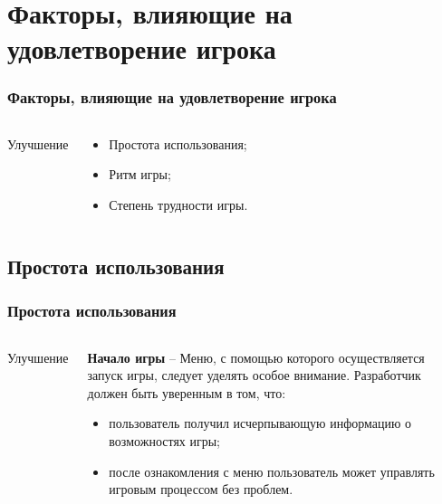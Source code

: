 \documentclass[10pt]{beamer}
\begin{document}
\section{Факторы, влияющие на удовлетворение игрока}
\begin{frame}
\frametitle{Факторы, влияющие на удовлетворение игрока}

\begin{columns}[c]

\begin{center}
  Улучшение
\end{center}

\begin{block}{}

  \begin{itemize}
    \item Простота использования;
    \item Ритм игры;
    \item Степень трудности игры.
  \end{itemize}
\end{block}
\end{columns}
\end{frame}

\subsection{Простота использования}
\begin{frame}
\frametitle{Простота использования}

\begin{columns}[c]

\begin{center}
  Улучшение
\end{center}

\begin{block}{}

  \textbf{Начало игры} -- Меню, с помощью которого осуществляется запуск игры, следует уделять особое внимание. Разработчик должен быть уверенным в том, что:
  \begin{itemize}
    \item пользователь получил исчерпывающую информацию о возможностях игры;
    \item после ознакомления с меню пользователь может управлять игровым процессом без проблем.
  \end{itemize}

\end{block}
\end{columns}
\end{frame}
\end{document}
